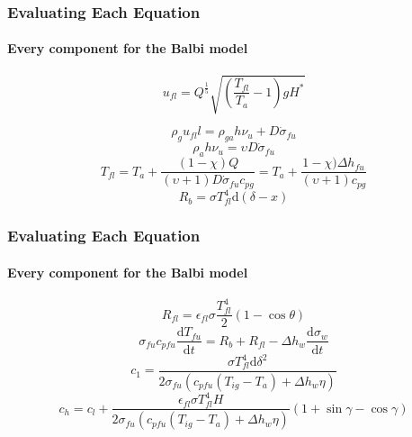 \documentclass{beamer}
\begin{document}
	\begin{frame}
		\frametitle{Evaluating Each Equation}
	\framesubtitle{Every component for the Balbi model}
	\begin{equation}
	\label{gas velocity}
	u_{fl} = Q ^ {\frac {1}{5}} \sqrt{(\frac {T_{fl}} {T_a} - 1) g H^{*}}
\end{equation}

\begin{equation}
	\label{mass balance balbi}
	\rho_g u_{fl}l = \rho_{ga} h \nu _u + D \dot{\sigma} _ {fu}
\end{equation}
\begin{equation}
	\rho _ a h \nu _ u = \upsilon D \dot{\sigma} _ {fu} \label{stoich ratio}
	\end{equation}
	\begin{equation}
	T_{fl} = T_a + \frac {(1 - \chi) Q}{(\upsilon + 1) D \dot{\sigma} _ {fu} c_{pg}} = T_a + \frac {1 - \chi) \Delta h _ {fu} }{(\upsilon + 1) c_{pg}} \label{flame temp balbi 2007}
	\end{equation}
	\begin{equation}
	R_b = \sigma T^{4}_{fl} \mathrm{d}(\delta - x) \label{R_b 2007}
	\end{equation}
\end{frame}


\begin{frame}
	\frametitle{Evaluating Each Equation}
	\framesubtitle{Every component for the Balbi model}
	
		\begin{equation}
	R_{fl} = \epsilon_{fl} \sigma \frac {T^{4}_{fl}} {2} (1 - \cos \theta) \label{flame_base_2007}
	\end{equation}
	\begin{equation}
	\sigma _ {fu} c _{pfu} \frac {\mathrm{d} T_{fu}} {\mathrm{d} t} = R_b + R_{fl} - \Delta h_w \frac {\mathrm{d} \sigma _ w } {\mathrm {d} t} \label{preheating sub mode 2007}
	\end{equation}
	\begin{equation}
	c_1 = \frac {\sigma T^{4}_{fl} \mathrm {d} \delta ^ 2} {2 \sigma _ {fu} (c_{pfu}(T_{ig} - T_a) + \Delta h _ w \eta)} \label{low regime ros}
	\end{equation}
	\begin{equation}
	c_h = c_l  + \frac {\epsilon _{fl} \sigma T^{4}_{fl} H} {2 \sigma _ {fu} (c_{pfu}(T_{ig} - T_a) + \Delta h _ w \eta)} (1 + \sin \gamma - \cos \gamma) \label{high speed regimes}
	\end{equation}
	
	
\end{frame}
\end{document}
